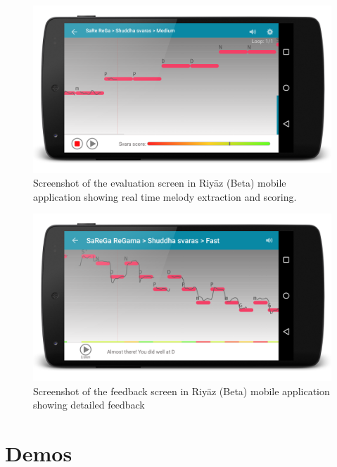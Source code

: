 \begin{figure}[h]
	\begin{center}
		\includegraphics[width=\figSizeEighty]{ch08_applications/figures/riyaz1.png}
	\end{center}
	\caption{Screenshot of the evaluation screen in Riy\={a}z (Beta) mobile application showing real time melody extraction and scoring.}
	\label{fig:riyaz_evaluation_screen}
\end{figure}
\begin{figure}[h]
	\begin{center}
		\includegraphics[width=\figSizeEighty]{ch08_applications/figures/riyaz2.png}
	\end{center}
	\caption{Screenshot of the feedback screen in Riy\={a}z (Beta) mobile application showing detailed feedback}
	\label{fig:riyaz_feedback_screen}
\end{figure}



\section{Demos}


